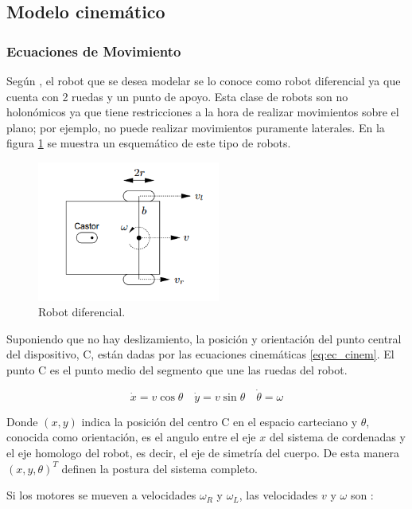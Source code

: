 \documentclass[10pt,conference,a4paper,onecolumn]{article}%
\begin{document}
\subsection{Modelo cinemático}
\label{modelo cinematico}
\subsubsection{Ecuaciones de Movimiento}
Según \cite{pathfoll}, el robot que se desea modelar se lo conoce como robot diferencial ya que cuenta con 2 ruedas y un punto de apoyo. Esta clase de robots son no holonómicos ya que tiene restricciones a la hora de realizar movimientos sobre el plano; por ejemplo, no puede realizar movimientos puramente laterales. En la figura \ref{fig:robot_diferencial} se muestra un esquemático de este tipo de robots.
\begin{figure}[h]
\centering
\includegraphics[width=6cm]{./imagenes/robot_diferencial.png}
\caption{Robot diferencial. }%
\label{fig:robot_diferencial}
\end{figure}

Suponiendo que no hay deslizamiento, la posición y orientación del punto central del dispositivo, C, están dadas por las ecuaciones cinemáticas \ref{eq:ec_cinem}. El punto C es el punto medio del segmento que une las ruedas del robot.

\begin{equation}
\dot{x}=v\cos\theta \quad \dot{y}=v\sin\theta \quad \dot{\theta}=\omega
\label{eq:ec_cinem}
\end{equation}

Donde $(x,y)$ indica la posición del centro C en el espacio carteciano y $\theta $, conocida como orientación, es el angulo entre el eje $x$ del sistema de cordenadas y el eje homologo del robot, es decir, el eje de simetría del cuerpo.  De esta manera $(x,y,\theta)^T$ definen la postura del sistema completo.

 Si los motores se mueven a velocidades $\omega_R$ y $\omega_L$, las velocidades $v$ y $\omega$ son \cite{planning}:
\end{document}
